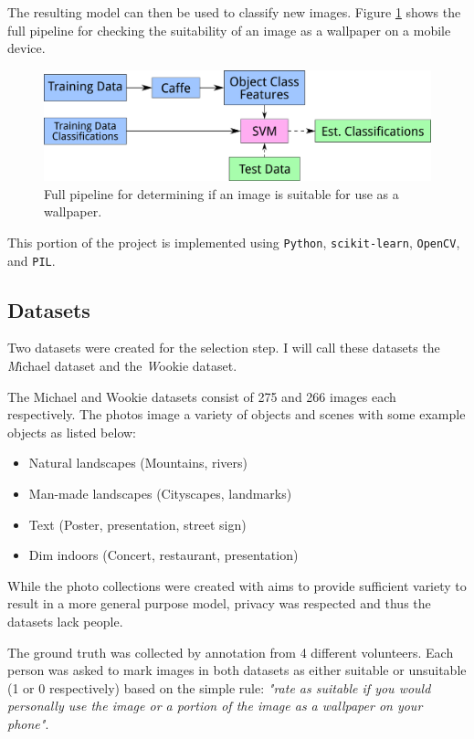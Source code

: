 The resulting model can then be used to classify new images.
Figure \ref{fig:pipeline_selection} shows the full pipeline for
checking the suitability of an image as a wallpaper on a mobile device.

\begin{figure}
\centering\includegraphics[width=0.7\columnwidth]{../figures/pipeline_suitability.pdf}
\caption{Full pipeline for determining if an image is suitable for use as a wallpaper.\label{fig:pipeline_selection}}
\end{figure}

This portion of the project is implemented using \texttt{Python},
\texttt{scikit-learn}, \texttt{OpenCV}, and \texttt{PIL}.

\subsection{Datasets}

Two datasets were created for the selection step. I will call these datasets the
\emph Michael dataset and the \emph Wookie dataset.

The Michael and Wookie datasets consist of 275 and 266 images each respectively.
The photos image a variety of objects and scenes with some example objects
as listed below:

\begin{itemize}
\item Natural landscapes (Mountains, rivers)
\item Man-made landscapes (Cityscapes, landmarks)
\item Text (Poster, presentation, street sign)
\item Dim indoors (Concert, restaurant, presentation)
\end{itemize}

While the photo collections were created with aims to provide sufficient variety
to result in a more general purpose model, privacy was respected and thus the
datasets lack people.

The ground truth was collected by annotation from 4 different volunteers.
Each person was asked to mark images in both datasets as either suitable or
unsuitable (1 or 0 respectively) based on the simple rule: \emph{"rate as
suitable if you would personally use the image or a portion of the image as a
wallpaper on your phone"}.

